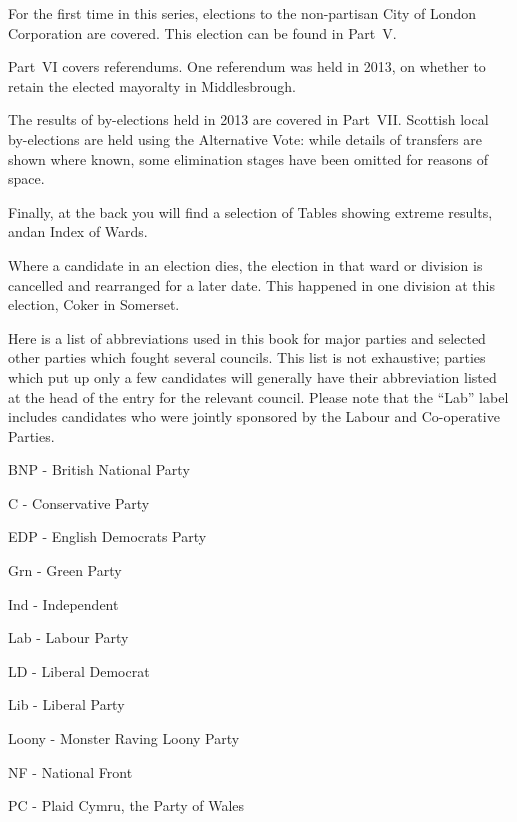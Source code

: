 \documentclass[a4paper,openany,10pt]{book}
\begin{document}
For the first time in this series, elections to the non-partisan City of London Corporation are covered.  This election can be found in Part~V.

Part~VI covers referendums.  One referendum was held in 2013, on whether to retain the elected mayoralty in Middlesbrough.

The results of by-elections held in 2013 are covered in Part~VII.  Scottish local by-elections are held using the Alternative Vote: while details of transfers are shown where known, some elimination stages have been omitted for reasons of space.

Finally, at the back you will find a selection of Tables showing extreme results, andan Index of Wards.

Where a candidate in an election dies, the election in that ward or division is
cancelled and rearranged for a later date.  This happened in %
one division at this election, Coker in Somerset.


Here is a list of abbreviations used in this book for major parties
and selected other parties which fought several councils.  This list
is not exhaustive; parties which put up only a few candidates will
generally have their abbreviation listed at the head of the entry for
the relevant council.  Please note that the ``Lab'' label includes
candidates who were jointly sponsored by the Labour and Co-operative
Parties.

BNP - British National Party

C - Conservative Party

EDP - English Democrats Party

Grn - Green Party

Ind - Independent

Lab - Labour Party

LD - Liberal Democrat

Lib - Liberal Party

Loony - Monster Raving Loony Party

NF - National Front

PC - Plaid Cymru, the Party of Wales
\end{document}

